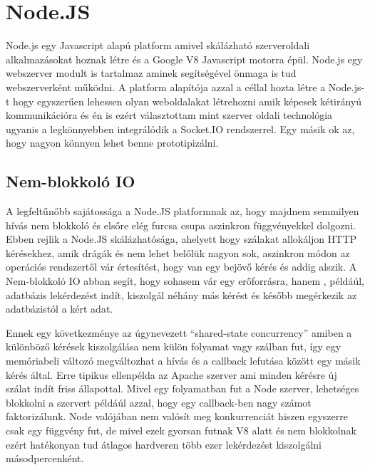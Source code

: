 \section{Node.JS}

Node.js egy Javascript alapú platform amivel skálázható szerveroldali alkalmazásokat hoznak létre és a Google V8 Javascript motorra épül. Node.js egy webszerver modult is tartalmaz aminek segítségével önmaga is tud webszerverként működni. A platform alapítója azzal a céllal hozta létre a Node.js-t hogy egyszerűen lehessen olyan weboldalakat létrehozni amik képesek kétirányú kommunikációra és én is ezért választottam mint szerver oldali technológia ugyanis a legkönnyebben integrálódik a Socket.IO rendszerrel.  Egy másik ok az, hogy nagyon könnyen lehet benne prototipizálni.



\subsection{Nem-blokkoló IO}

A legfeltűnőbb sajátossága a Node.JS platformnak az, hogy majdnem semmilyen hívás nem blokkoló és elsőre elég furcsa csupa aszinkron függvényekkel dolgozni. Ebben rejlik a Node.JS skálázhatósága, ahelyett hogy szálakat allokáljon HTTP kérésekhez, amik drágák és nem lehet belőlük nagyon sok, aszinkron módon az operációs rendszertől vár értesítést, hogy van egy bejövő kérés és addig alszik. A Nem-blokkoló IO abban segít, hogy sohasem vár egy erőforrásra, hanem , példáúl, adatbázis lekérdezést indít, kiszolgál néhány más kérést és később megérkezik az adatbázistól a kért adat. 

Ennek egy következménye az úgynevezett ``shared-state concurrency'' amiben a különböző kérések kiszolgálása nem külön folyamat vagy szálban fut, így egy memóriabeli változó megváltozhat a hívás és a callback lefutása között egy másik kérés által. Erre tipikus ellenpélda az Apache szerver ami minden kérésre új szálat indít friss állapottal. Mivel egy folyamatban fut a Node szerver, lehetséges blokkolni a szervert példáúl azzal, hogy egy callback-ben nagy számot faktorizálunk. Node valójában nem valósít meg konkurrenciát hiszen egyszerre csak egy függvény fut, de mivel ezek gyorsan futnak V8 alatt és nem blokkolnak ezért hatékonyan tud átlagos hardveren több ezer lekérdezést kiszolgálni másodpercenként\cite{nodebook}.

